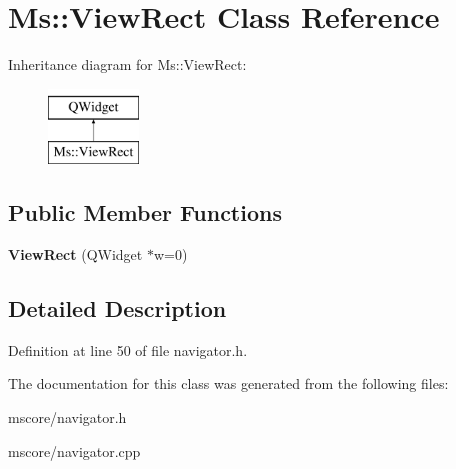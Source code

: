 \hypertarget{class_ms_1_1_view_rect}{}\section{Ms\+:\+:View\+Rect Class Reference}
\label{class_ms_1_1_view_rect}
Inheritance diagram for Ms\+:\+:View\+Rect\+:\begin{figure}[H]
\begin{center}
\leavevmode
\includegraphics[height=2.000000cm]{class_ms_1_1_view_rect}
\end{center}
\end{figure}
\subsection*{Public Member Functions}
\begin{DoxyCompactItemize}
\item 
\mbox{\label{class_ms_1_1_view_rect_a6772583c453a623ec199fb1846571acd}} 
{\bfseries View\+Rect} (Q\+Widget $\ast$w=0)
\end{DoxyCompactItemize}


\subsection{Detailed Description}


Definition at line 50 of file navigator.\+h.



The documentation for this class was generated from the following files\+:\begin{DoxyCompactItemize}
\item 
mscore/navigator.\+h\item 
mscore/navigator.\+cpp\end{DoxyCompactItemize}
